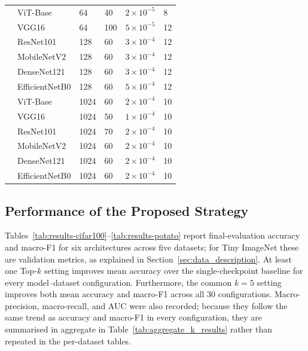 \documentclass[runningheads]{llncs}
\begin{document}
{\begin{longtable}{@{} D M B E L P @{}}
    & ViT-Base       & 64  & 40  & $2{\times}10^{-5}$   &  8 \\*
    & VGG16          & 64  & 100 & $5{\times}10^{-5}$   & 12 \\*
    & ResNet101      & 128 & 60  & $3{\times}10^{-4}$   & 12 \\*
    & MobileNetV2    & 128 & 60  & $3{\times}10^{-4}$   & 12 \\*
    & DenseNet121    & 128 & 60  & $3{\times}10^{-4}$   & 12 \\*
    & EfficientNetB0 & 128 & 60  & $5{\times}10^{-4}$   & 12 \\
    \midrule

    & ViT-Base       & 1024 & 60 & $2{\times}10^{-4}$   & 10 \\*
    & VGG16          & 1024 & 50 & $1{\times}10^{-4}$   & 10 \\*
    & ResNet101      & 1024 & 70 & $2{\times}10^{-4}$   & 10 \\*
    & MobileNetV2    & 1024 & 60 & $2{\times}10^{-4}$   & 10 \\*
    & DenseNet121    & 1024 & 60 & $2{\times}10^{-4}$   & 10 \\*
    & EfficientNetB0 & 1024 & 60 & $2{\times}10^{-4}$   & 10 \\

  \end{longtable}
}%

%

\subsection{Performance of the Proposed Strategy}
\label{sec:main_results}
Tables~\ref{tab:results-cifar100}--\ref{tab:results-potato} report
final-evaluation accuracy and macro-F1 for six architectures across five
datasets; for Tiny ImageNet these are validation metrics, as explained in
Section~\ref{sec:data_description}. At least one Top-$k$ setting improves mean
accuracy over the single-checkpoint baseline for every model--dataset
configuration. Furthermore, the common $k=5$ setting improves both mean
accuracy and macro-F1 across all 30 configurations. Macro-precision,
macro-recall, and AUC were also recorded; because they follow the same trend
as accuracy and macro-F1 in every configuration, they are summarised in
aggregate in Table~\ref{tab:aggregate_k_results} rather than repeated in the
per-dataset tables.
\end{document}

